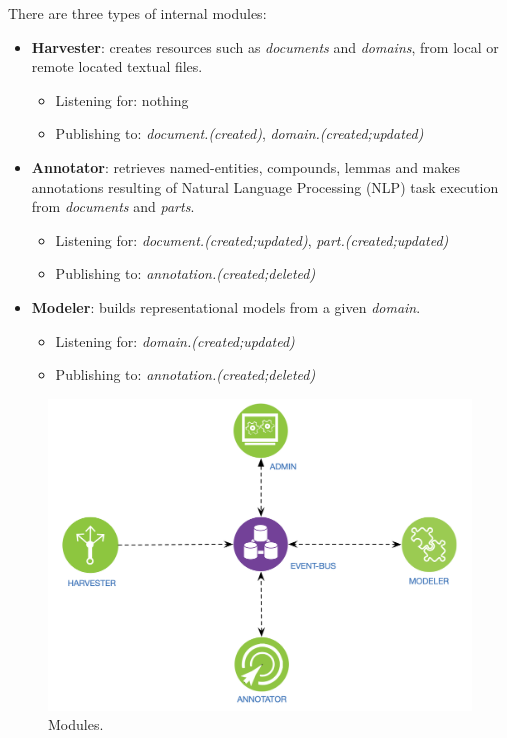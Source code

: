 There are three types of internal modules:
\begin{itemize}
	\item \textbf{Harvester}: creates resources such as \textit{documents} and \textit{domains}, from local or remote located textual files.
    \begin{itemize}[rightmargin=\dimexpr\linewidth-5cm-\leftmargin\relax]
    		\item Listening for: nothing
		\item Publishing to: \textit{document.(created)}, \textit{domain.(created;updated)}
    \end{itemize}
    \item \textbf{Annotator}: retrieves named-entities, compounds, lemmas and makes annotations resulting of Natural Language Processing (NLP) task execution from \textit{documents} and \textit{parts}.
    \begin{itemize}[rightmargin=\dimexpr\linewidth-5cm-\leftmargin\relax]
    	\item Listening for: \textit{document.(created;updated)}, \textit{part.(created;updated)}
		\item Publishing to: \textit{annotation.(created;deleted)}
    \end{itemize}
    \item \textbf{Modeler}: builds representational models from a given \textit{domain}. 
    \begin{itemize}[rightmargin=\dimexpr\linewidth-5cm-\leftmargin\relax]
    	\item Listening for: \textit{domain.(created;updated)}
		\item Publishing to: \textit{annotation.(created;deleted)}
    \end{itemize}
\end{itemize}

\begin{figure}
  \includegraphics[scale=0.25]{modules}
  \caption{Modules.}
  \label{fig:librairy-modules}
\end{figure}


